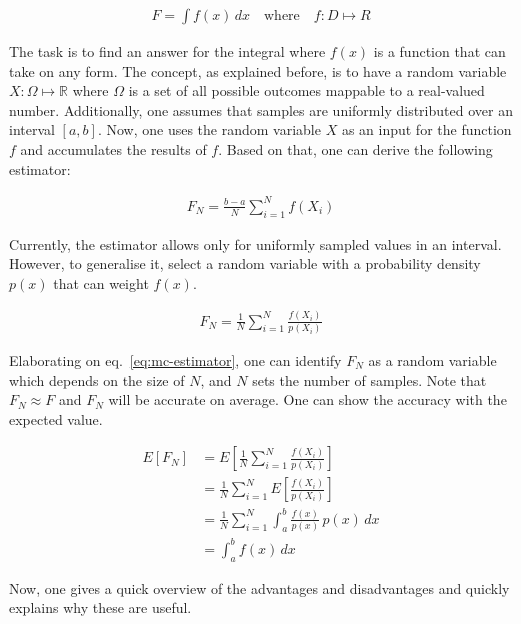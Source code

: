 \begin{align*}
    F=\int f(x)\,dx\quad\text{where}\quad f:D \mapsto R
\end{align*}

The task is to find an answer for the integral where $f(x)$ is a function that can take on any form.
The concept, as explained before, is to have a random variable $X:\Omega\mapsto\mathbb{R}$ where $\Omega$ is a set of all possible outcomes mappable to a real-valued number.
Additionally, one assumes that samples are uniformly distributed over an interval $[a,b]$.
Now, one uses the random variable $X$ as an input for the function $f$ and accumulates the results of $f$.
Based on that, one can derive the following estimator:

\begin{align*}
    F_N=\frac{b-a}{N}\sum_{i=1}^{N}f(X_i)
\end{align*}

Currently, the estimator allows only for uniformly sampled values in an interval.
However, to generalise it, select a random variable with a probability density $p(x)$ that can weight $f(x)$.

\begin{align}
    F_N=\frac{1}{N}\sum_{i=1}^{N}\frac{f(X_i)}{p(X_i)} \label{eq:mc-estimator}
\end{align}

Elaborating on eq.~\ref{eq:mc-estimator}, one can identify $F_N$ as a random variable which depends on the size of $N$, and $N$ sets the number of samples.
Note that $F_N \approx F$ and $F_N$ will be accurate on average.
One can show the accuracy with the expected value.

\begin{align*}
    E[F_N] & =E\left[\frac{1}{N}\sum_{i=1}^{N}\frac{f(X_i)}{p(X_i)}\right]     \\
           & =\frac{1}{N}\sum_{i=1}^{N}E\left[\frac{f(X_i)}{p(X_i)}\right]     \\
           & =\frac{1}{N}\sum_{i=1}^{N}\int_{a}^{b}\frac{f(x)}{p(x)}\,p(x)\,dx \\ &=\int_{a}^{b}f(x)\,dx
\end{align*}

Now, one gives a quick overview of the advantages and disadvantages and quickly explains why these are useful.

